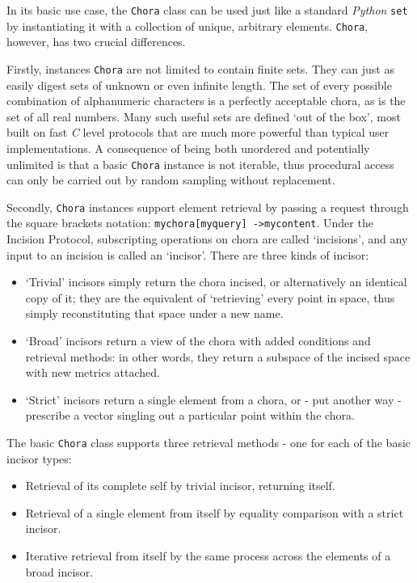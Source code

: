 \documentclass[a4paper,11pt,oneside]{book}
\begin{document}
In its basic use case, the \texttt{Chora} class can be used just like a standard \textit{Python} \texttt{set} by instantiating it with a collection of unique, arbitrary elements. \texttt{Chora}, however, has two crucial differences.

Firstly, instances \texttt{Chora} are not limited to contain finite sets. They can just as easily digest sets of unknown or even infinite length. The set of every possible combination of alphanumeric characters is a perfectly acceptable chora, as is the set of all real numbers. Many such useful sets are defined `out of the box', most built on fast \textit{C} level protocols that are much more powerful than typical user implementations. A consequence of being both unordered and potentially unlimited is that a basic \texttt{Chora} instance is not iterable, thus procedural access can only be carried out by random sampling without replacement.

Secondly, \texttt{Chora} instances support element retrieval by passing a request through the square brackets notation: \texttt{mychora[myquery] -\textgreater  mycontent}. Under the Incision Protocol, subscripting operations on chora are called `incisions', and any input to an incision is called an `incisor'. There are three kinds of incisor:

\begin{itemize}
\item `Trivial' incisors simply return the chora incised, or alternatively an identical copy of it; they are the equivalent of `retrieving' every point in space, thus simply reconstituting that space under a new name.
\item `Broad' incisors return a view of the chora with added conditions and retrieval methods: in other words, they return a subspace of the incised space with new metrics attached.
\item `Strict' incisors return a single element from a chora, or - put another way - prescribe a vector singling out a particular point within the chora.
\end{itemize}

The basic \texttt{Chora} class supports three retrieval methods - one for each of the basic incisor types:

\begin{itemize}
\item Retrieval of its complete self by trivial incisor, returning itself.
\item Retrieval of a single element from itself by equality comparison with a strict incisor.
\item Iterative retrieval from itself by the same process across the elements of a broad incisor.
\end{itemize}
\end{document}
